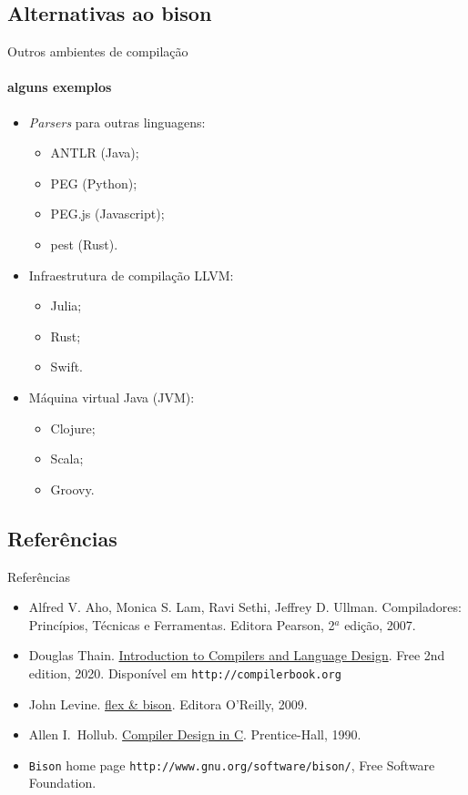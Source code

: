\subsection{Alternativas ao bison}
\frame{\tableofcontents[currentsubsection]}

\begin{frame}{Outros ambientes de compilação}
  \framesubtitle{alguns exemplos}
  \begin{itemize}
  \item {\it Parsers} para outras linguagens:
    \begin{itemize}
    \item ANTLR (Java);
    \item PEG (Python);
    \item PEG.js (Javascript);
    \item pest (Rust).
    \end{itemize}
  \item Infraestrutura de compilação LLVM:
    \begin{itemize}
    \item Julia;
    \item Rust;
    \item Swift.
    \end{itemize}
  \item Máquina virtual Java (JVM):
    \begin{itemize}
    \item Clojure;
    \item Scala;
    \item Groovy.
    \end{itemize}
  \end{itemize}
\end{frame}

\subsection*{Referências}

\begin{frame}{Referências}

  \begin{itemize}
  \item Alfred V. Aho, Monica S. Lam, Ravi Sethi, Jeffrey D. Ullman.
    Compiladores: Princípios, Técnicas e Ferramentas. Editora
    Pearson, 2$^a$ edição, 2007.

  \item Douglas Thain. \href{http://compilerbook.org}{Introduction to
      Compilers and Language Design}. Free 2nd edition, 2020.
    Disponível em {\tt http://compilerbook.org}

  \item John Levine.
    \href{https://www.oreilly.com/library/view/flex-bison/9780596805418/}{flex
      \& bison}. Editora O'Reilly, 2009.

  \item Allen I.\ Hollub.
   \href{https://holub.com/compiler/}{Compiler Design in C}.
    Prentice-Hall, 1990.

  \item {\tt Bison} home page {\tt http://www.gnu.org/software/bison/}, Free
    Software Foundation.
  \end{itemize}
 \end{frame}
